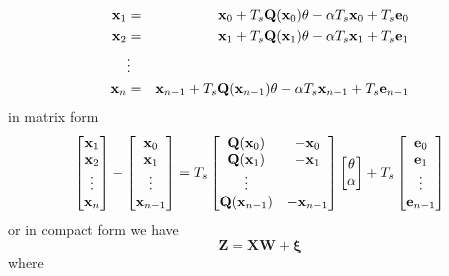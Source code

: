 \documentclass[onecolumn,draftcls]{IEEEtran}
\begin{document}
\begin{eqnarray}
 \mathbf x_{1}&=&\mathbf x_{0}+T_s \mathbf Q(\mathbf x_0)\mathbf \mathbf{\theta}-\alpha T_s\mathbf x_0+T_s\mathbf e_0 \nonumber \\
 \mathbf x_{2}&=&\mathbf x_{1}+T_s \mathbf Q(\mathbf x_1)\mathbf \mathbf{\theta}-\alpha T_s\mathbf x_1+T_s\mathbf e_1\nonumber\\
&\vdots& \nonumber\\
 \mathbf x_{n}&=&\mathbf x_{n-1}+T_s \mathbf Q(\mathbf x_{n-1})\mathbf \mathbf{\theta}-\alpha T_s\mathbf x_{n-1}+T_s\mathbf e_{n-1}
\end{eqnarray}
in matrix form
\begin{equation}
 \begin{bmatrix} \mathbf x_{1}\\\mathbf x_{2}\\\vdots\\\mathbf x_{n}\end{bmatrix}-\begin{bmatrix} \mathbf x_{0}\\\mathbf x_{1}\\\vdots\\\mathbf x_{n-1}\end{bmatrix}=T_s\begin{bmatrix}\mathbf Q(\mathbf x_0)&-\mathbf x_{0}\\\mathbf Q(\mathbf x_1)&-\mathbf x_{1}\\\vdots\\ \mathbf Q(\mathbf x_{n-1})&-\mathbf x_{n-1}\end{bmatrix}\begin{bmatrix}\mathbf \mathbf{\theta} \\ \alpha\end{bmatrix}+T_s\begin{bmatrix}\mathbf e_0\\\mathbf e_1\\\vdots\\\mathbf e_{n-1}\end{bmatrix}
\end{equation}
or in compact form we have
\begin{equation}
 \mathbf Z=\mathbf X \mathbf W+\boldsymbol \xi
\end{equation}
where
\end{document}
